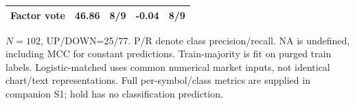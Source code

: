 \begin{table}[!htbp]
\begin{tabular}{lrrrr}
Factor vote & 46.86 & 8/9 & -0.04 & 8/9 \\
\hline
\end{tabular}\par\medskip
\begin{minipage}{\textwidth}\footnotesize $N=102$, UP/DOWN=25/77. P/R denote class precision/recall. NA is undefined, including MCC for constant predictions. Train-majority is fit on purged train labels. Logistic-matched uses common numerical market inputs, not identical chart/text representations. Full per-symbol/class metrics are supplied in companion S1; hold has no classification prediction.\end{minipage}
\end{table}
